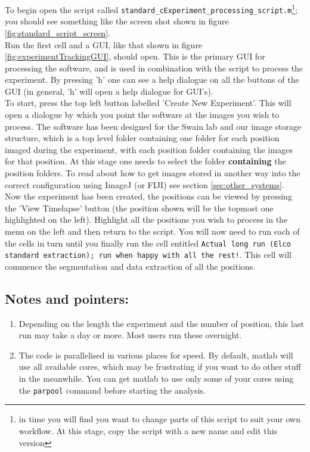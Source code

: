 To begin open the script called \texttt{standard\_cExperiment\_processing\_script.m}\footnote{in time you will find you want to change parts of this script to suit your own workflow. At this stage, copy the script with a new name and edit this version}; you should see something like the screen shot shown in figure \ref{fig:standard_script_screen}.\\
Run the first cell and a GUI, like that shown in figure \ref{fig:experimentTrackingGUI}, should open. This is the primary GUI for processing the software, and is used in combination with the script to process the experiment. By pressing 'h' one can see a help dialogue on all the buttons of the GUI (in general, 'h' will open a help dialogue for GUI's).\\
To start, press the top left button labelled 'Create New Experiment'. This will open a dialogue by which you point the software at the images you wish to process. The software has been designed for the Swain lab and our image storage structure, which is a top level folder containing one folder for each position imaged during the experiment, with each position folder containing the images for that position. At this stage one needs to select the folder \textbf{containing} the position folders. To read about how to get images stored in another way into the correct configuration using ImageJ (or FIJI) see section \ref{sec:other_systems}.\\
Now the experiment has been created, the positions can be viewed by pressing the 'View Timelapse' button (the position shown will be the topmost one highlighted on the left). Highlight all the positions you wish to process in the menu on the left and then return to the script. You will now need to run each of the cells in turn until you finally run the cell entitled \texttt{Actual long run (Elco standard extraction); run when happy with all the rest!}. This cell will commence the segmentation and data extraction of all the positions. 

\subsection{Notes and pointers:}
\begin{enumerate}
\item Depending on the length the experiment and the number of position, this last run may take a day or more. Most users run these overnight.
\item The code is parallelised in various places for speed. By default, matlab will use all available cores, which may be frustrating if you want to do other stuff in the meanwhile. You can get matlab to use only some of your cores using the \texttt{parpool} command before starting the analysis.
\end{enumerate}

